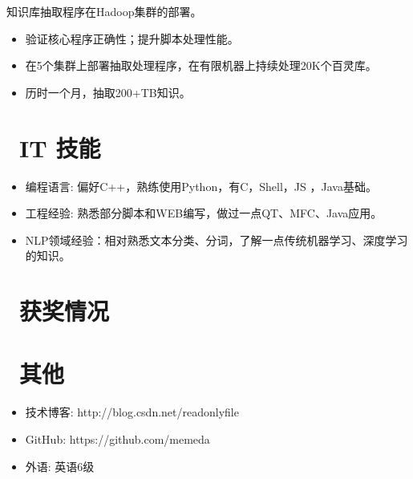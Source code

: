 \documentclass{resume}
\begin{document}
知识库抽取程序在Hadoop集群的部署。
\begin{itemize}
  \item 验证核心程序正确性；提升脚本处理性能。
  \item 在5个集群上部署抽取处理程序，在有限机器上持续处理20K个百灵库。
  \item 历时一个月，抽取200+TB知识。
\end{itemize}


\section{\faCogs\ IT 技能}
\begin{itemize}[parsep=0.5ex]
  \item 编程语言: 偏好C++，熟练使用Python，有C，Shell，JS ，Java基础。
  \item 工程经验: 熟悉部分脚本和WEB编写，做过一点QT、MFC、Java应用。
  \item NLP领域经验：相对熟悉文本分类、分词，了解一点传统机器学习、深度学习的知识。
\end{itemize}

\section{\faHeartO\ 获奖情况}

\section{\faInfo\ 其他}
\begin{itemize}[parsep=0.5ex]
  \item 技术博客: http://blog.csdn.net/readonlyfile
  \item GitHub: https://github.com/memeda
  \item 外语: 英语6级
\end{itemize}

%
%
\end{document}
